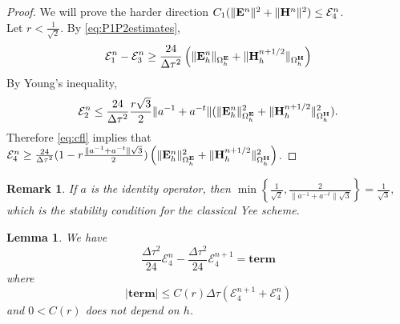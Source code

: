 \documentclass[12pt,reqno]{amsart}
\newcommand{\e}{{\bf E}}
\newcommand{\h}{{\bf H}}
\newtheorem{lem}[theorem]{Lemma}
\newtheorem{remark}[theorem]{Remark}
\theoremstyle{definition}
\numberwithin{equation}{section}
\def\Gwh{\Omega_h}
\begin{document}
\begin{proof}
	We will prove the harder direction 
	$ C_1(\|\e^n\|^2+\|\h^n\|^2)\leq \mathcal{E}_4^n$.\\
Let $r<\frac{1}{\sqrt{2}}$.
By \eqref{eq:P1P2estimates}, $$\mathcal{E}_1^n-\mathcal{E}_3^n\geq
\frac{24}{\Delta \tau^2}\left ( \|\e_h^n\|_{\Gwh^\e}+\|\h_h^{n+1/2}\|_{\Gwh^\h}\right)$$
By Young's inequality,
$$
\mathcal{E}_2^n\leq \frac{24}{\Delta \tau^2}\frac{r\sqrt{3}}{2}\|a^{-1}+a^{-t}\|(\|\e_h^n\|^2_{\Gwh^\e}+\|\h_h^{n+1/2}\|^2_{\Gwh^\h}).
$$
Therefore \eqref{eq:cfl} implies that
 $\mathcal{E}_4^n\geq\frac{24}{\Delta \tau^2} (1-r\frac{\|a^{-1}+a^{-t}\|\sqrt{3}}{2})\left ( \|\e_h^n\|^2_{\Gwh^\e}+\|\h_h^{n+1/2}\|^2_{\Gwh^\h}\right)$.
\end{proof}
\begin{remark}
	If $a$ is the identity operator, then 
	$\min \left \{  \frac{1}{\sqrt{2}},\frac{2}{\|a^{-1}+a^{-t}\|\sqrt{3}}  \right \}=
	\frac{1}{\sqrt{3}},
	$
	which is the stability condition for the classical Yee scheme.
\end{remark}
\begin{lem}\label{lem:sec} 
	We have
	$$\frac{\Delta \tau^2}{24}\mathcal{E}_4^n-
\frac{\Delta \tau^2}{24}\mathcal{E}_4^{n+1}=
\mathbf{term}
$$
where 
$$
|\mathbf{term}|\leq C(r) \Delta \tau(\mathcal{E}_4^{n+1}+\mathcal{E}_4^{n})
$$
and $0<C(r)$ does not depend on $h$.
\end{lem}
\end{document}
